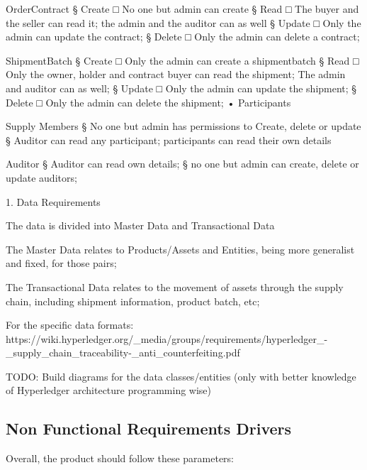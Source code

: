 		\par OrderContract
			§ Create
				□ No one but admin can create
			§ Read
				□ The buyer and the seller can read it; the admin and the auditor can as well
			§ Update
				□ Only the admin can update the contract;
			§ Delete
				□ Only the admin can delete a contract;
		\par ShipmentBatch
			§ Create
				□ Only the admin can create a shipmentbatch
			§ Read
				□ Only the owner, holder and contract buyer can read the shipment; The admin and auditor can as well;
			§ Update
				□ Only the admin can update the shipment;
			§ Delete
				□ Only the admin can delete the shipment;
	• Participants
		\par Supply Members
			§ No one but admin has permissions to Create, delete or update
			§ Auditor can read any participant; participants can read their own details
		\par Auditor
			§ Auditor can read own details; 
			§ no one but admin can create, delete or update auditors;
		

	1. Data Requirements
		\par The data is divided into Master Data and Transactional Data
		\par The Master Data relates to Products/Assets and Entities, being more generalist and fixed, for those pairs;
		\par The Transactional Data relates to the movement of assets through the supply chain, including shipment information, product batch, etc;
		\par For the specific data formats: https://wiki.hyperledger.org/\_media/groups/requirements/hyperledger\_-\_supply\_chain\_traceability-\_anti\_counterfeiting.pdf
		\par TODO: Build diagrams for the data classes/entities (only with better knowledge of Hyperledger architecture programming wise)
		
		

\subsection{Non Functional Requirements Drivers}

Overall, the product should follow these parameters:

